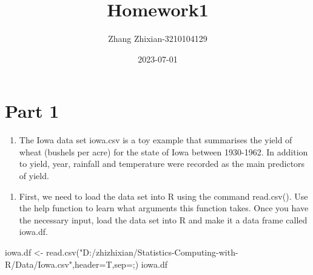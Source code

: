 \documentclass[
]{article}
\title{Homework1}
\author{Zhang Zhixian-3210104129}
\date{2023-07-01}
\newenvironment{Shaded}{\begin{snugshade}}{\end{snugshade}}
\newcommand{\AttributeTok}[1]{\textcolor[rgb]{0.77,0.63,0.00}{#1}}
\newcommand{\FunctionTok}[1]{\textcolor[rgb]{0.00,0.00,0.00}{#1}}
\newcommand{\NormalTok}[1]{#1}
\newcommand{\OtherTok}[1]{\textcolor[rgb]{0.56,0.35,0.01}{#1}}
\newcommand{\StringTok}[1]{\textcolor[rgb]{0.31,0.60,0.02}{#1}}
\providecommand{\tightlist}{%
  \setlength{\itemsep}{0pt}\setlength{\parskip}{0pt}}
\begin{document}
\maketitle

{
\setcounter{tocdepth}{2}
\tableofcontents
}
\hypertarget{part-1}{%
\section{Part 1}\label{part-1}}

\begin{enumerate}
\def\labelenumi{\arabic{enumi}.}
\tightlist
\item
  The Iowa data set iowa.csv is a toy example that summarises the yield
  of wheat (bushels per acre) for the state of Iowa between 1930-1962.
  In addition to yield, year, rainfall and temperature were recorded as
  the main predictors of yield.
\end{enumerate}

\begin{enumerate}
\def\labelenumi{\alph{enumi}.}
\tightlist
\item
  First, we need to load the data set into R using the command
  read.csv(). Use the help function to learn what arguments this
  function takes. Once you have the necessary input, load the data set
  into R and make it a data frame called iowa.df.
\end{enumerate}

\begin{Shaded}
\begin{Highlighting}[]
\NormalTok{iowa.df }\OtherTok{\textless{}{-}} \FunctionTok{read.csv}\NormalTok{(}\StringTok{"D:/zhizhixian/Statistics{-}Computing{-}with{-}R/Data/Iowa.csv"}\NormalTok{,}\AttributeTok{header=}\NormalTok{T,}\AttributeTok{sep=}\StringTok{\textquotesingle{};\textquotesingle{}}\NormalTok{)}
\NormalTok{iowa.df}
\end{Highlighting}
\end{Shaded}
\end{document}
